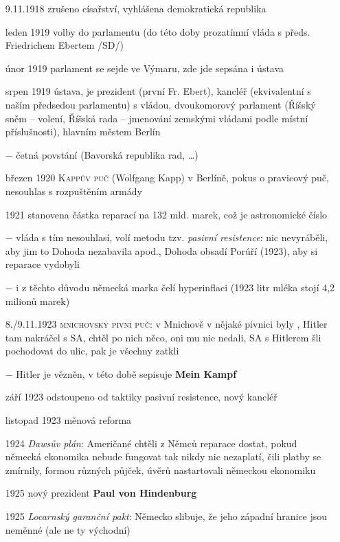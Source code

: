 \documentclass{article}
\begin{document}
\begin{itemize}
  \vspace{-0.5em}
  \setlength\itemsep{0.15em}
  \item[9.11.1918] zrušeno císařství, vyhlášena demokratická republika
  \item[leden 1919] volby do parlamentu (do této doby prozatímní vláda s předs. Friedrichem Ebertem /SD/)
  \item[únor 1919] parlament se sejde ve Výmaru, zde jde sepsána i ústava
  \item[srpen 1919] ústava, je prezident (první Fr. Ebert), kancléř (ekvivalentní s naším předsedou parlamentu) s vládou, dvoukomorový parlament (Říšský sněm -- volení, Říšská rada -- jmenování zemskými vládami podle místní příslušnosti), hlavním městem Berlín
  \item[$-$] četná povstání (Bavorská republika rad, \dots)
  \item[březen 1920] \textsc{Kappův puč}  (Wolfgang Kapp) v Berlíně, pokus o pravicový puč, nesouhlas s rozpuštěním armády
  \item[1921] stanovena částka reparací na 132 mld. marek, což je astronomické číslo
  \item[$-$] vláda s tím nesouhlasí, volí metodu tzv. \textit{pasivní resistence}:  nic nevyráběli, aby jim to Dohoda nezabavila apod., Dohoda obsadí Porúří (1923), aby si reparace vydobyli
  \item[$-$] i z těchto důvodu německá marka čelí hyperinflaci (1923 litr mléka stojí 4,2 milionů marek)
  \item[8./9.11.1923] \textsc{mnichovský pivní puč}: v Mnichově v nějaké pivnici byly , Hitler tam nakráčel s SA, chtěl po nich něco, oni mu nic nedali, SA s Hitlerem šli pochodovat do ulic, pak je všechny zatkli
  \item[$-$] Hitler je vězněn, v této době sepisuje \textbf{Mein Kampf}
  \item[září 1923] odstoupeno od taktiky pasivní resistence, nový kancléř
  \item[listopad 1923] měnová reforma
  \item[1924] \textit{Dawsův plán}: Američané chtěli z Němců reparace dostat, pokud německá ekonomika nebude fungovat tak nikdy nic nezaplatí, čili platby se zmírnily, formou různých půjček, úvěrů nastartovali německou ekonomiku
  \item[1925] nový prezident \textbf{Paul von Hindenburg}
  \item[1925] \textit{Locarnský garanční pakt}: Německo slibuje, že jeho západní hranice jsou neměnné (ale ne ty východní)

\end{itemize}
\end{document}
